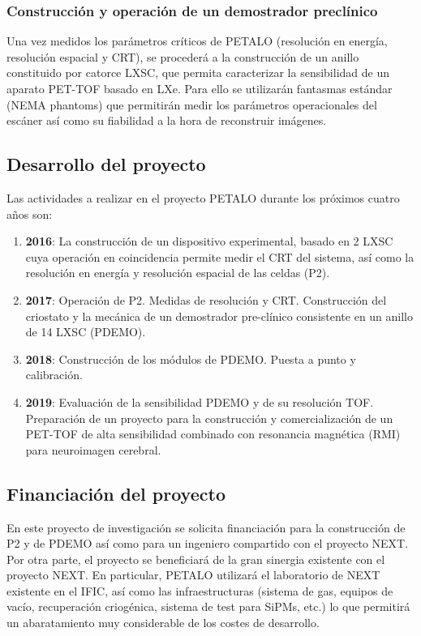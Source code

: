 \subsubsection*{Construcción y operación de un demostrador preclínico}
Una vez medidos los parámetros críticos de PETALO (resolución en energía, resolución espacial y CRT), se procederá a la construcción de un anillo constituido por catorce LXSC, que permita caracterizar la sensibilidad de un aparato PET-TOF basado en LXe. Para ello se utilizarán fantasmas estándar (NEMA phantoms) que permitirán medir los parámetros operacionales del escáner así como su fiabilidad a la hora de reconstruir imágenes.

\subsection*{Desarrollo del proyecto}
Las actividades a realizar en el proyecto PETALO durante los próximos cuatro años son:
\begin{enumerate}
\item {\bf 2016}: La construcción de un dispositivo experimental, basado en 2 LXSC cuya operación en coincidencia permite medir el CRT del sistema, así como la resolución en energía y resolución espacial de las celdas (P2).
\item {\bf 2017}: Operación de P2. Medidas de resolución y CRT. Construcción del criostato y la mecánica de un demostrador pre-clínico consistente en un anillo de 14 LXSC (PDEMO). 
\item {\bf 2018}: Construcción de los módulos de PDEMO. Puesta a punto y calibración. 
\item {\bf 2019}: Evaluación de la sensibilidad PDEMO y de su resolución TOF. Preparación de un proyecto para la construcción y comercialización de un PET-TOF de alta sensibilidad combinado con resonancia magnética (RMI) para neuroimagen cerebral.   
\end{enumerate}

\subsection*{Financiación del proyecto}

En este proyecto de investigación se solicita financiación para la construcción de P2 y de PDEMO así como para un ingeniero compartido con el proyecto NEXT. Por otra parte, el proyecto se beneficiará de la gran sinergia existente con el proyecto NEXT. En particular, PETALO utilizará el laboratorio de NEXT existente en el IFIC, así como las infraestructuras (sistema de gas, equipos de vacío, recuperación criogénica, sistema de test para SiPMs, etc.) lo que permitirá un abaratamiento muy considerable de los costes de desarrollo. 

